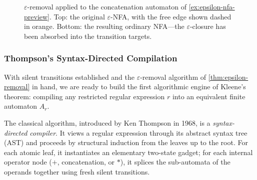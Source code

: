 \begin{figure}[ht]
\centering
{}
\caption{$\varepsilon$-removal applied to the concatenation automaton of
\cref{ex:epsilon-nfa-preview}.  Top: the original $\varepsilon$-NFA,
with the free edge shown dashed in orange.  Bottom: the resulting
ordinary NFA---the $\varepsilon$-closure has been absorbed into the
transition targets.}
\label{fig:epsilon-removal-example}
\end{figure}

\subsubsection*{Thompson's Syntax-Directed Compilation}

With silent transitions established and the $\varepsilon$-removal algorithm of \cref{thm:epsilon-removal} in hand, we are ready to build the first algorithmic engine of Kleene's theorem: compiling any restricted regular expression $r$ into an equivalent finite automaton $A_r$.

The classical algorithm, introduced by Ken Thompson in 1968, is a \emph{syntax-directed compiler}. It views a regular expression through its abstract syntax tree (AST) and proceeds by structural induction from the leaves up to the root. For each atomic leaf, it instantiates an elementary two-state gadget; for each internal operator node ($+$, concatenation, or $*$), it splices the sub-automata of the operands together using fresh silent transitions.

